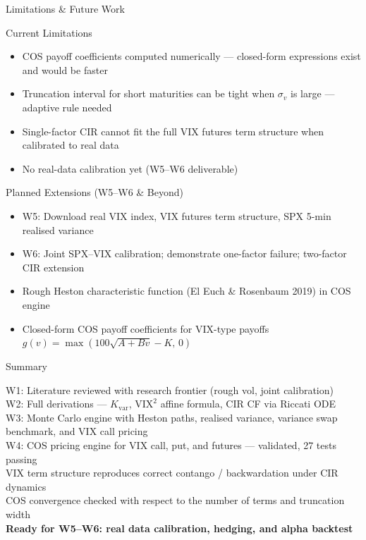 \documentclass[aspectratio=169, 11pt]{beamer}
\begin{document}
\begin{frame}{Limitations \& Future Work}

\begin{block}{Current Limitations}
\begin{itemize}
  \item COS payoff coefficients computed numerically --- closed-form expressions exist and would be faster
  \item Truncation interval for short maturities can be tight when $\sigma_v$ is large --- adaptive rule needed
  \item Single-factor CIR cannot fit the full VIX futures term structure when calibrated to real data
  \item No real-data calibration yet (W5--W6 deliverable)
\end{itemize}
\end{block}

\begin{block}{Planned Extensions (W5--W6 \& Beyond)}
\begin{itemize}
  \item W5: Download real VIX index, VIX futures term structure, SPX 5-min realised variance
  \item W6: Joint SPX--VIX calibration; demonstrate one-factor failure; two-factor CIR extension
  \item Rough Heston characteristic function (El Euch \& Rosenbaum 2019) in COS engine
  \item Closed-form COS payoff coefficients for VIX-type payoffs $g(v) = \max(100\sqrt{A+Bv}-K,\,0)$
\end{itemize}
\end{block}
\end{frame}

\begin{frame}{Summary}
\begin{center}
\begin{minipage}{0.85\textwidth}
  \checkmark\; W1: Literature reviewed with research frontier (rough vol, joint calibration)\\[4pt]
  \checkmark\; W2: Full derivations --- $K_{\mathrm{var}}$, $\mathrm{VIX}^2$ affine formula, CIR CF via Riccati ODE\\[4pt]
  \checkmark\; W3: Monte Carlo engine with Heston paths, realised variance, variance swap benchmark, and VIX call pricing\\[4pt]
  \checkmark\; W4: COS pricing engine for VIX call, put, and futures --- validated, 27 tests passing\\[4pt]
  \checkmark\; VIX term structure reproduces correct contango / backwardation under CIR dynamics\\[4pt]
  \checkmark\; COS convergence checked with respect to the number of terms and truncation width\\[12pt]
  \medium\textbf{Ready for W5--W6: real data calibration, hedging, and alpha backtest}
\end{minipage}
\end{center}
\end{frame}
\end{document}
